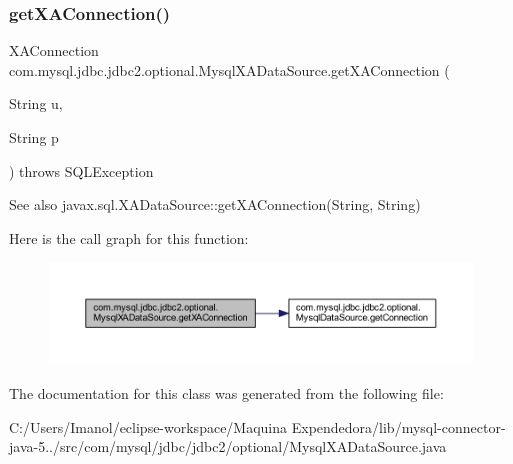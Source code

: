 \subsubsection{\texorpdfstring{get\+X\+A\+Connection()}{getXAConnection()}\hspace{0.1cm}{\footnotesize\ttfamily [2/2]}}
{\footnotesize\ttfamily X\+A\+Connection com.\+mysql.\+jdbc.\+jdbc2.\+optional.\+Mysql\+X\+A\+Data\+Source.\+get\+X\+A\+Connection (\begin{DoxyParamCaption}\item[{String}]{u,  }\item[{String}]{p }\end{DoxyParamCaption}) throws S\+Q\+L\+Exception}

\begin{DoxySeeAlso}{See also}
javax.\+sql.\+X\+A\+Data\+Source\+::get\+X\+A\+Connection(\+String, String) 
\end{DoxySeeAlso}
Here is the call graph for this function\+:
\nopagebreak
\begin{figure}[H]
\begin{center}
\leavevmode
\includegraphics[width=350pt]{classcom_1_1mysql_1_1jdbc_1_1jdbc2_1_1optional_1_1_mysql_x_a_data_source_a761134f83e2cba1ce06abd3185720691_cgraph}
\end{center}
\end{figure}


The documentation for this class was generated from the following file\+:\begin{DoxyCompactItemize}
\item 
C\+:/\+Users/\+Imanol/eclipse-\/workspace/\+Maquina Expendedora/lib/mysql-\/connector-\/java-\/5../src/com/mysql/jdbc/jdbc2/optional/Mysql\+X\+A\+Data\+Source.\+java\end{DoxyCompactItemize}
